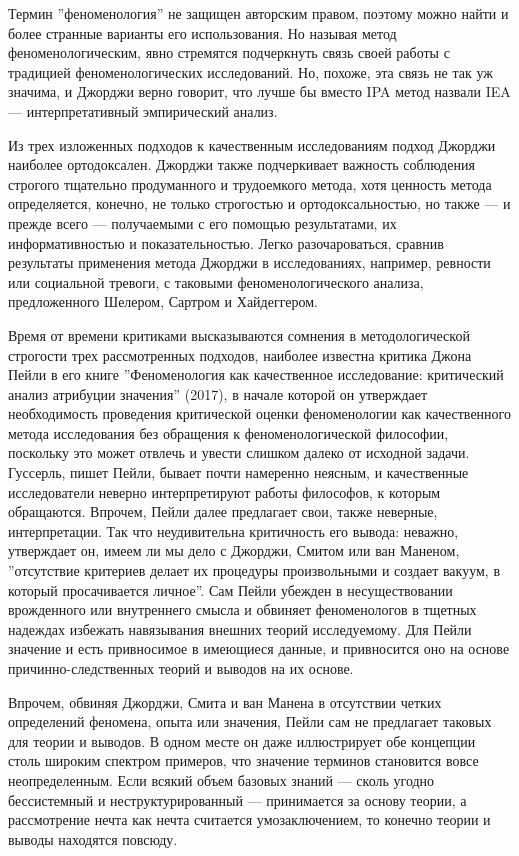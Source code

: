 \documentclass[11pt]{book}
\begin{document}
Термин ''феноменология'' не защищен авторским правом, поэтому можно найти и более странные варианты его использования. Но называя метод феноменологическим, явно стремятся подчеркнуть связь своей работы с традицией феноменологических исследований. Но, похоже, эта связь не так уж значима, и Джорджи верно говорит, что лучше бы вместо IPA метод назвали IEA --- интерпретативный эмпирический анализ.

Из трех изложенных подходов к качественным исследованиям подход Джорджи наиболее ортодоксален. Джорджи также подчеркивает важность соблюдения строгого тщательно продуманного и трудоемкого метода, хотя ценность метода определяется, конечно, не только строгостью и ортодоксальностью, но также --- и прежде всего --- получаемыми с его помощью результатами, их информативностью и показательностью. Легко разочароваться, сравнив результаты применения метода Джорджи в исследованиях, например, ревности или социальной тревоги, с таковыми феноменологического анализа, предложенного Шелером, Сартром и Хайдеггером.

Время от времени критиками высказываются сомнения в методологической строгости трех рассмотренных подходов, наиболее известна критика Джона Пейли в его книге ''Феноменология как качественное исследование: критический анализ атрибуции значения'' (2017), в начале которой он утверждает необходимость проведения критической оценки феноменологии как качественного метода исследования без обращения к феноменологической философии, поскольку это может отвлечь и увести слишком далеко от исходной задачи. Гуссерль, пишет Пейли, бывает почти намеренно неясным, и качественные исследователи неверно интерпретируют работы философов, к которым обращаются. Впрочем, Пейли далее предлагает свои, также неверные, интерпретации. Так что неудивительна критичность его вывода: неважно, утверждает он, имеем ли мы дело с Джорджи, Смитом или ван Маненом, ''отсутствие критериев делает их процедуры произвольными и создает вакуум, в который просачивается личное''. Сам Пейли убежден в несуществовании врожденного или внутреннего смысла и обвиняет феноменологов в тщетных надеждах избежать навязывания внешних теорий исследуемому. Для Пейли значение и есть привносимое в имеющиеся данные, и привносится оно на основе причинно-следственных теорий и выводов на их основе.

Впрочем, обвиняя Джорджи, Смита и ван Манена в отсутствии четких определений феномена, опыта или значения, Пейли сам не предлагает таковых для теории и выводов. В одном месте он даже иллюстрирует обе концепции столь широким спектром примеров, что значение терминов становится вовсе неопределенным. Если всякий объем базовых знаний --- сколь угодно бессистемный и неструктурированный --- принимается за основу теории, а рассмотрение нечта как нечта считается умозаключением, то конечно теории и выводы находятся повсюду.
\end{document}
